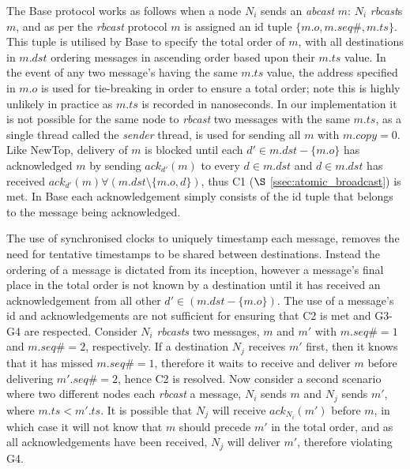     The \textsf{Base} protocol works as follows when a node $N_i$ sends an \emph{abcast} $m$: $N_i$ \emph{rbcast}s $m$, and as per the \emph{rbcast} protocol $m$ is assigned an id tuple $\{m.o, m.seq\#, m.ts\}$.  This tuple is utilised by \textsf{Base} to specify the total order of $m$, with all destinations in $m.dst$ ordering messages in ascending order based upon their $m.ts$ value.  In the event of any two message's having the same $m.ts$ value, the address specified in $m.o$ is used for tie-breaking in order to ensure a total order; note this is highly unlikely in practice as $m.ts$ is recorded in nanoseconds.  In our implementation it is not possible for the same node to \emph{rbcast} two messages with the same $m.ts$, as a single thread called the \emph{sender} thread, is used for sending all $m$ with $m.copy = 0$.  Like NewTop, delivery of $m$ is blocked until each $d' \in m.dst - \{m.o\}$ has acknowledged $m$ by sending $ack_{d'}(m)$ to every $d \in m.dst$ and $d \in m.dst$ has received $ack_{d'}(m) \forall (m.dst \setminus \{m.o,d\})$, thus C1 ($\S$ \ref{ssec:atomic_broadcast}) is met.  In \textsf{Base} each acknowledgement simply consists of the id tuple that belongs to the message being acknowledged.  
    
    The use of synchronised clocks to uniquely timestamp each message, removes the need for tentative timestamps to be shared between destinations.  Instead the ordering of a message is dictated from its inception, however a message's final place in the total order is not known by a destination until it has received an acknowledgement from all other $d' \in (m.dst - \{m.o\})$.  The use of a message's id and acknowledgements are not sufficient for ensuring that C2 is met and G3-G4 are respected.  Consider $N_i$ \emph{rbcasts} two messages, $m$ and $m'$ with $m.seq\# = 1$ and $m.seq\# = 2$, respectively.  If a destination $N_j$ receives $m'$ first, then it knows that it has missed $m.seq\# = 1$, therefore it waits to receive and deliver $m$ before delivering $m'.seq\# = 2$, hence C2 is resolved.  Now consider a second scenario where two different nodes each \emph{rbcast} a message, $N_i$ sends $m$ and $N_j$ sends $m'$, where $m.ts < m'.ts$.  It is possible that $N_j$ will receive $ack_{N_i}(m')$ before $m$, in which case it will not know that $m$ should precede $m'$ in the total order, and as all acknowledgements have been received, $N_j$ will deliver $m'$, therefore violating G4.  
    
